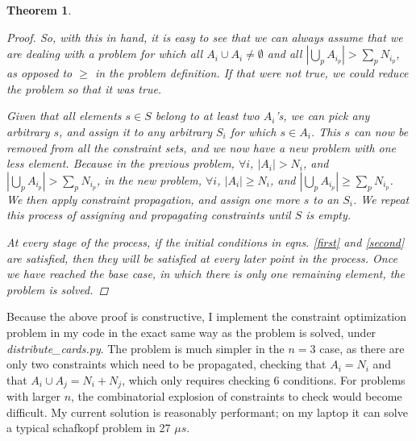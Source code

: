 \documentclass[]{article}
\newtheorem{theorem}{Theorem}
\begin{document}
\begin{theorem}
\begin{proof}
So, with this in hand, it is easy to see that we can always assume that we are dealing with a problem for which all $A_i \cup A_i \neq \emptyset$ and all  $|\bigcup_p A_{i_p} | > \sum_p N_{i_p}$, as opposed to $\geq$ in the problem definition.
If that were not true, we could reduce the problem so that it was true. \newline

Given that all elements $s \in S$ belong to at least two $A_i$'s, we can pick any arbitrary $s$, and assign it to any arbitrary $S_i$ for which $s \in A_i$.
This $s$ can now be removed from all the constraint sets, and we now have a new problem with one less element.
 Because in the previous problem, $\forall i$, $|A_i| > N_i$, and $|\bigcup_p A_{i_p} | > \sum_p N_{i_p}$, in the new problem, $\forall i$, $|A_i| \geq N_i$, and $|\bigcup_p A_{i_p} | \geq \sum_p N_{i_p}$.
We then apply constraint propagation, and assign one more $s$ to an $S_i$. We repeat this process of assigning and propagating constraints until $S$ is empty. \newline

At every stage of the process, if the initial conditions in eqns. \ref{first} and \ref{second} are satisfied, then they will be satisfied at every later point in the process. Once we have reached the base case, in which there is only one remaining element, the problem is solved.
\end{proof}
\end{theorem}

Because the above proof is constructive, I implement the constraint optimization problem in my code in the exact same way as the problem is solved, under \textit{distribute\_cards.py}. The problem is much simpler in the $n = 3$ case, as there are only two constraints which need to be propagated, checking that $A_i = N_i$ and that $A_i \cup A_j = N_i + N_j$, which only requires checking 6 conditions. For problems with larger $n$, the combinatorial explosion of constraints to check would become difficult. My current solution is reasonably performant; on my laptop it can solve a typical schafkopf problem in 27 $\mu s$.
\end{document}

